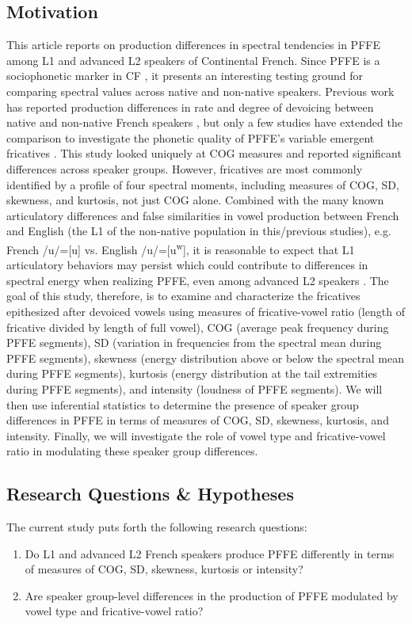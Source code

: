 \documentclass[output=paper,colorlinks,citecolor=brown,draftmode]{langscibook}
\begin{document}
\subsection{Motivation}
This article reports on production differences in spectral tendencies in PFFE among L1 and advanced L2 speakers of Continental French. Since PFFE is a sociophonetic marker in CF \citep{dalola2014drole,dalola2016perception}, it presents an interesting testing ground for comparing spectral values across native and non-native speakers. Previous work has reported production differences in rate and degree of devoicing between native and non-native French speakers \citep{dalola2017sociophonetic}, but only a few studies have extended the comparison to investigate the phonetic quality of PFFE’s variable emergent fricatives \citep{dalola2020redefining}. This study looked uniquely at COG measures and reported significant differences across speaker groups. However, fricatives are most commonly identified by a profile of four spectral moments, including measures of COG, SD, skewness, and kurtosis, not just COG alone. Combined with the many known articulatory differences and false similarities in vowel production between French and English (the L1 of the non-native population in this/previous studies), e.g. French /u/=[u] vs. English /u/=[u\textsuperscript{w}], it is reasonable to expect that L1 articulatory behaviors may persist which could contribute to differences in spectral energy when realizing PFFE, even among advanced L2 speakers \citep{flege1984limits, flege1987production, flege1995second}. The goal of this study, therefore, is to examine and characterize the fricatives epithesized after devoiced vowels using measures of fricative-vowel ratio (length of fricative divided by length of full vowel), COG (average peak frequency during PFFE segments), SD (variation in frequencies from the spectral mean during PFFE segments), skewness (energy distribution above or below the spectral mean during PFFE segments), kurtosis (energy distribution at the tail extremities during PFFE segments), and intensity (loudness of PFFE segments). We will then use inferential statistics to determine the presence of speaker group differences in PFFE in terms of measures of COG, SD, skewness, kurtosis, and intensity. Finally, we will investigate the role of vowel type and fricative-vowel ratio in modulating these speaker group differences.

\subsection{Research Questions \& Hypotheses}
The current study puts forth the following research questions:
\begin{enumerate}
    \item Do L1 and advanced L2 French speakers produce PFFE differently in terms of measures of COG, SD, skewness, kurtosis or intensity?
    \item Are speaker group-level differences in the production of PFFE modulated by vowel type and fricative-vowel ratio?
\end{enumerate}
\end{document}
